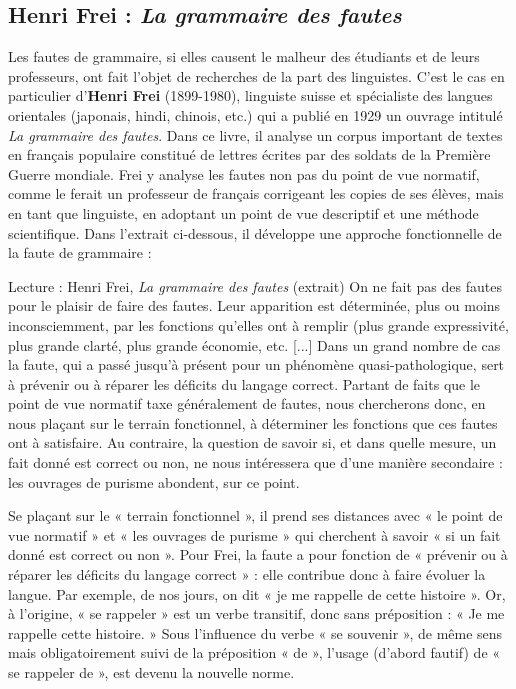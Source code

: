 \subsection{Henri Frei : \textit{La grammaire des fautes}}
Les fautes de grammaire, si elles causent le malheur des étudiants et de leurs professeurs, ont fait l’objet de recherches de la part des linguistes. C’est le cas en particulier d’\textbf{Henri Frei} (1899-1980), linguiste suisse et spécialiste des langues orientales (japonais, hindi, chinois, etc.) qui a publié en 1929 un ouvrage intitulé \textit{La grammaire des fautes}. Dans ce livre, il analyse un corpus important de textes en français populaire constitué de lettres écrites par des soldats de la Première Guerre mondiale. Frei y analyse les fautes non pas du point de vue normatif, comme le ferait un professeur de français corrigeant les copies de ses élèves, mais en tant que linguiste, en adoptant un point de vue descriptif et une méthode scientifique. Dans l’extrait ci-dessous, il développe une approche fonctionnelle de la faute de grammaire :
\begin{lecture}{Lecture : Henri Frei, \textit{La grammaire des fautes} (extrait)}
On ne fait pas des fautes pour le plaisir de faire des fautes. Leur apparition est déterminée, plus ou moins inconsciemment, par les fonctions qu’elles ont à remplir (plus grande expressivité, plus grande clarté, plus grande économie, etc. [...] Dans un grand nombre de cas la faute, qui a passé jusqu’à présent pour un phénomène quasi-pathologique, sert à prévenir ou à réparer les déficits du langage correct. Partant de faits que le point de vue normatif taxe généralement de fautes, nous chercherons donc, en nous plaçant sur le terrain fonctionnel, à déterminer les fonctions que ces fautes ont à satisfaire. Au contraire, la question de savoir si, et dans quelle mesure, un fait donné est correct ou non, ne nous intéressera que d’une manière secondaire : les ouvrages de purisme abondent, sur ce point.
\end{lecture}
Se plaçant sur le « terrain fonctionnel », il prend ses distances avec « le point de vue normatif » et « les ouvrages de purisme » qui cherchent à savoir « si un fait donné est correct ou non ». Pour Frei, la faute a pour fonction de « prévenir ou à réparer les déficits du langage correct » : elle contribue donc à faire évoluer la langue. Par exemple, de nos jours, on dit « je me rappelle de cette histoire ». Or, à l’origine, « se rappeler » est un verbe transitif, donc sans préposition : « Je me rappelle cette histoire. » Sous l’influence du verbe « se souvenir », de même sens mais obligatoirement suivi de la préposition « de », l’usage (d’abord fautif) de « se rappeler de », est devenu la nouvelle norme.
